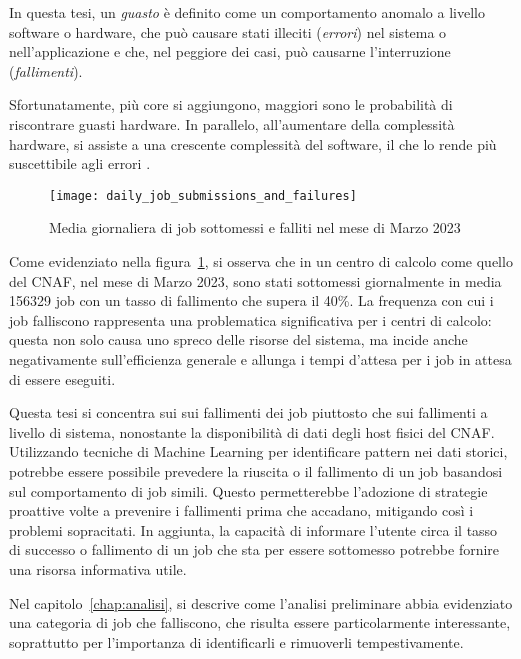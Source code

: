 In questa tesi, un \textit{guasto} è definito come un comportamento anomalo a
livello software o hardware, che può causare stati illeciti (\textit{errori})
nel sistema o nell'applicazione e che, nel peggiore dei casi, può causarne
l'interruzione (\textit{fallimenti}).

Sfortunatamente, più core si aggiungono, maggiori sono le probabilità di
riscontrare guasti hardware. In parallelo, all'aumentare della complessità
hardware, si assiste a una crescente complessità del software, il che lo rende
più suscettibile agli errori \cite{Cappello2014}.

\begin{figure}[!ht]
    \begin{center}
        \texttt{[image: daily\_job\_submissions\_and\_failures]}
    \end{center}
    \caption{Media giornaliera di job sottomessi e falliti nel mese di Marzo
    2023}\label{fig:daily_job_submissions_and_failures}
\end{figure}

Come evidenziato nella figura~\ref{fig:daily_job_submissions_and_failures}, si
osserva che in un centro di calcolo come quello del CNAF, nel mese di Marzo
2023, sono stati sottomessi giornalmente in media 156329 job con un tasso di
fallimento che supera il 40\%. 
La frequenza con cui i job falliscono rappresenta una problematica
significativa per i centri di calcolo: questa non solo causa uno spreco delle
risorse del sistema, ma incide anche negativamente sull'efficienza generale e
allunga i tempi d'attesa per i job in attesa di essere eseguiti.

Questa tesi si concentra sui sui fallimenti dei job piuttosto che sui
fallimenti a livello di sistema, nonostante la disponibilità di dati degli
host fisici del CNAF. Utilizzando tecniche di Machine Learning per
identificare pattern nei dati storici, potrebbe essere possibile prevedere la
riuscita o il fallimento di un job basandosi sul comportamento di job simili.
Questo permetterebbe l'adozione di strategie proattive volte a prevenire i
fallimenti prima che accadano, mitigando così i problemi sopracitati. In
aggiunta, la capacità di informare l'utente circa il tasso di successo o
fallimento di un job che sta per essere sottomesso potrebbe fornire una
risorsa informativa utile.

\mbox{}

Nel capitolo~\ref{chap:analisi}, si descrive come l'analisi preliminare abbia
evidenziato una categoria di job che falliscono, che risulta essere
particolarmente interessante, soprattutto per l'importanza di identificarli e
rimuoverli tempestivamente.

